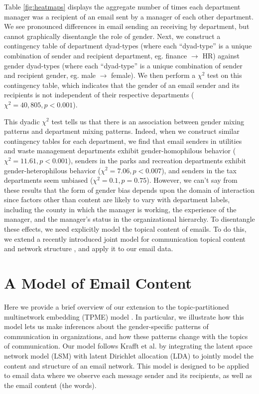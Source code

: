 \documentclass{pnastwo}
\begin{document}
\begin{article}
Table \ref{fig:heatmaps} displays the aggregate number of times each department manager was a recipient of an email sent by a manager of each other department. We see pronounced differences in email sending an receiving by department, but cannot graphically disentangle the role of gender. 
Next, we construct a contingency table of department dyad-types (where each ``dyad-type'' is a unique combination of sender and recipient department, eg. finance $\longrightarrow$ HR) against gender dyad-types (where each ``dyad-type'' is a unique combination of sender and recipient gender, eg. male $\longrightarrow$ female).  We then perform a $\chi^2$ test on this contingency table, which indicates that the gender of an email sender and its recipients is not independent of their respective departments ($\chi^2 = 40,805, p < 0.001$).
	
	
This dyadic $\chi^2$ test tells us that there is an association between gender mixing patterns and department mixing patterns. Indeed, when we construct similar contingency tables for each department, we find that email senders in utilities and waste management departments exhibit gender-homophilous behavior ($\chi^2 = 11.61, p < 0.001$), senders in the parks and recreation departments exhibit gender-heterophilous behavior ($\chi^2 = 7.06, p < 0.007$), and senders in the tax departments seem unbiased ($\chi^2 = 0.1, p = 0.75$). However, we can't say from these results that the form of gender bias depends upon the domain of interaction since factors other than content are likely to vary with department labels, including the county in which the manager is working, the experience of the manager, and the manager's status in the organizational hierarchy. To disentangle these effects, we need explicitly model the topical content of emails. To do this, we extend a recently introduced joint model for communication topical content and network structure \citep{Krafft2012}, and apply it to our email data.
	


\section{A Model of Email Content}
Here we provide a brief overview of our extension to the topic-partitioned
multinetwork embedding (TPME) model \citep{Krafft2012}. In particular, we illustrate how this model lets us make inferences about the gender-specific patterns of communication in organizations, and how these patterns change with the topics of communication. Our model follows Krafft et al. \citep{Krafft2012} by integrating the latent space network model (LSM) \citep{Hoff2002a} with latent Dirichlet allocation (LDA) \cite{Blei2003} to jointly model the content and structure of an email network. This model is designed to be applied to email data where we observe each message sender and its recipients, as well as the email content (the words). 


\end{article}
\end{document}
